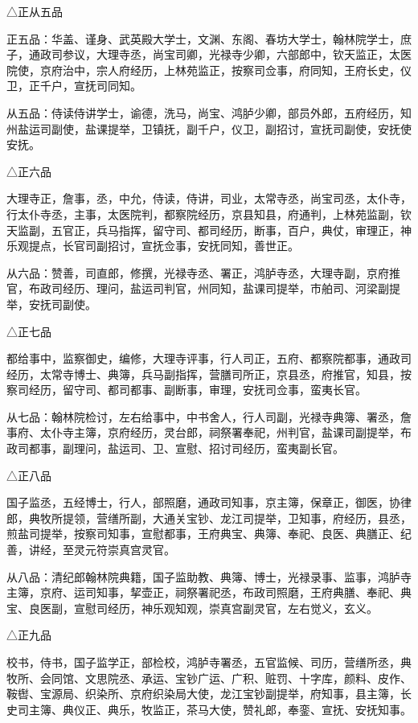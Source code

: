 \documentclass[a4paper,12pt,UTF8,twoside]{ctexbook}
\begin{document}
    △正从五品
    
    正五品：华盖、谨身、武英殿大学士，文渊、东阁、春坊大学士，翰林院学士，庶子，通政司参议，大理寺丞，尚宝司卿，光禄寺少卿，六部郎中，钦天监正，太医院使，京府治中，宗人府经历，上林苑监正，按察司佥事，府同知，王府长史，仪卫，正千户，宣抚司同知。
    
    从五品：侍读侍讲学士，谕德，洗马，尚宝、鸿胪少卿，部员外郎，五府经历，知州盐运司副使，盐课提举，卫镇抚，副千户，仪卫，副招讨，宣抚司副使，安抚使安抚。
    
    △正六品
    
    大理寺正，詹事，丞，中允，侍读，侍讲，司业，太常寺丞，尚宝司丞，太仆寺，行太仆寺丞，主事，太医院判，都察院经历，京县知县，府通判，上林苑监副，钦天监副，五官正，兵马指挥，留守司、都司经历，断事，百户，典仗，审理正，神乐观提点，长官司副招讨，宣抚佥事，安抚同知，善世正。
    
    从六品：赞善，司直郎，修撰，光禄寺丞、署正，鸿胪寺丞，大理寺副，京府推官，布政司经历、理问，盐运司判官，州同知，盐课司提举，市舶司、河梁副提举，安抚司副使。
    
    △正七品
    
    都给事中，监察御史，编修，大理寺评事，行人司正，五府、都察院都事，通政司经历，太常寺博士、典簿，兵马副指挥，营膳司所正，京县丞，府推官，知县，按察司经历，留守司、都司都事、副断事，审理，安抚司佥事，蛮夷长官。
    
    从七品：翰林院检讨，左右给事中，中书舍人，行人司副，光禄寺典簿、署丞，詹事府、太仆寺主簿，京府经历，灵台郎，祠祭署奉祀，州判官，盐课司副提举，布政司都事，副理问，盐运司、卫、宣慰、招讨司经历，蛮夷副长官。
    
    △正八品
    
    国子监丞，五经博士，行人，部照磨，通政司知事，京主簿，保章正，御医，协律郎，典牧所提领，营缮所副，大通关宝钞、龙江司提举，卫知事，府经历，县丞，煎盐司提举，按察司知事，宣慰都事，王府典宝、典簿、奉祀、良医、典膳正、纪善，讲经，至灵元符崇真宫灵官。
    
    从八品：清纪郎翰林院典籍，国子监助教、典簿、博士，光禄录事、监事，鸿胪寺主簿，京府、运司知事，挈壶正，祠祭署祀丞，布政司照磨，王府典膳、奉祀、典宝、良医副，宣慰司经历，神乐观知观，崇真宫副灵官，左右觉义，玄义。
    
    △正九品
    
    校书，侍书，国子监学正，部检校，鸿胪寺署丞，五官监候、司历，营缮所丞，典牧所、会同馆、文思院丞、承运、宝钞广运、广积、赃罚、十字库，颜料、皮作、鞍辔、宝源局、织染所、京府织染局大使，龙江宝钞副提举，府知事，县主簿，长史司主簿、典仪正、典乐，牧监正，茶马大使，赞礼郎，奉銮、宣抚、安抚知事。
    
\end{document}
